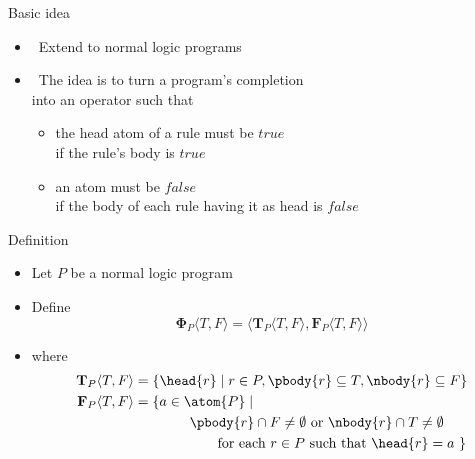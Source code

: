 \begin{frame}{Basic idea}
  \bigskip
  \begin{itemize}
  \item {} \ Extend  to normal logic programs
    \medskip
  \item {} \
    The idea is to turn a program's completion\\ into an operator such that
    \smallskip
    \begin{itemize}
    \item the head atom of a rule must be $\mathit{true}$\\
      if the rule's body is $\mathit{true}$
    \item an atom must be $\mathit{false}$\\
      if the body of each rule having it as head is $\mathit{false}$
    \end{itemize}
  \end{itemize}
\end{frame}
\begin{frame}{Definition}
  \bigskip
  \begin{itemize}
  \item<1-> Let $P$ be a normal logic program
  \item<2-> Define
    \[
    {\mathbf{\Phi}}_P\langle T,F \rangle
    =
    \langle
    {\mathbf{T}}_P\langle T,F \rangle,
    {\mathbf{F}}_P\langle T,F \rangle
    \rangle
    \]
  \item<2-> []
    where
    \begin{align*}
      {\mathbf{T}}_P\langle T,F \rangle
      & =
      \{  \head{r} \mid r \in P, \pbody{r} \subseteq T, \nbody{r} \subseteq F  \}
      \\
      {\mathbf{F}}_P\langle T,F \rangle
      & =
      \{  a \in \atom{P} \mid
      \\ &  \qquad\qquad
      \pbody{r} \cap F \neq \emptyset
      \text{ or }
      \nbody{r} \cap T \neq \emptyset
      \\ &  \qquad\qquad\qquad
      \text{for each } r \in P
      \text{ such that }
      \head{r} = a
      \ \}
    \end{align*}
  \end{itemize}
\end{frame}

